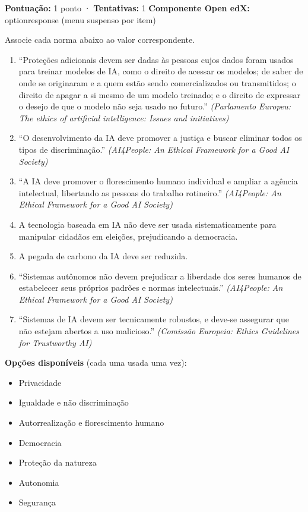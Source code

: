 \documentclass[
  11pt,
]{article}
\providecommand{\tightlist}{%
  \setlength{\itemsep}{0pt}\setlength{\parskip}{0pt}}
\renewcommand{\texttt}[1]{{\color{iaAmeixa}\small\ttfamily #1}}
\begin{document}
\textbf{Pontuação:} 1 ponto · \textbf{Tentativas:} 1 \textbf{Componente
Open edX:} \texttt{optionresponse} (menu suspenso por item)

Associe cada norma abaixo ao valor correspondente.

\begin{enumerate}
\def\labelenumi{\arabic{enumi}.}
\item
  ``Proteções adicionais devem ser dadas às pessoas cujos dados foram
  usados para treinar modelos de IA, como o direito de acessar os
  modelos; de saber de onde se originaram e a quem estão sendo
  comercializados ou transmitidos; o direito de apagar a si mesmo de um
  modelo treinado; e o direito de expressar o desejo de que o modelo não
  seja usado no futuro.'' \emph{(Parlamento Europeu: The ethics of
  artificial intelligence: Issues and initiatives)}
\item
  ``O desenvolvimento da IA deve promover a justiça e buscar eliminar
  todos os tipos de discriminação.'' \emph{(AI4People: An Ethical
  Framework for a Good AI Society)}
\item
  ``A IA deve promover o florescimento humano individual e ampliar a
  agência intelectual, libertando as pessoas do trabalho rotineiro.''
  \emph{(AI4People: An Ethical Framework for a Good AI Society)}
\item
  A tecnologia baseada em IA não deve ser usada sistematicamente para
  manipular cidadãos em eleições, prejudicando a democracia.
\item
  A pegada de carbono da IA deve ser reduzida.
\item
  ``Sistemas autônomos não devem prejudicar a liberdade dos seres
  humanos de estabelecer seus próprios padrões e normas intelectuais.''
  \emph{(AI4People: An Ethical Framework for a Good AI Society)}
\item
  ``Sistemas de IA devem ser tecnicamente robustos, e deve-se assegurar
  que não estejam abertos a uso malicioso.'' \emph{(Comissão Europeia:
  Ethics Guidelines for Trustworthy AI)}
\end{enumerate}

\textbf{Opções disponíveis} (cada uma usada uma vez):

\begin{itemize}
\tightlist
\item
  Privacidade
\item
  Igualdade e não discriminação
\item
  Autorrealização e florescimento humano
\item
  Democracia
\item
  Proteção da natureza
\item
  Autonomia
\item
  Segurança
\end{itemize}
\end{document}
